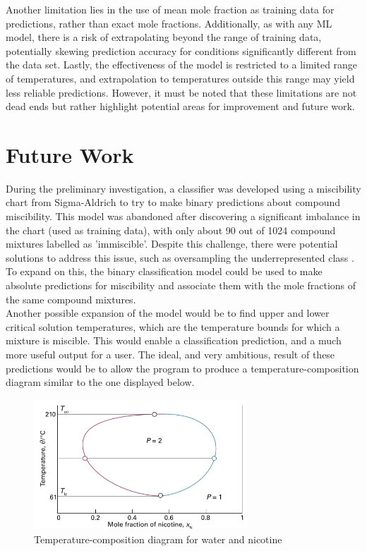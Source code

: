 \documentclass[11pt, titlepage]{article}
\begin{document}
Another limitation lies in the use of mean mole fraction as training data for predictions, rather than exact mole fractions. Additionally, as with any ML model, there is a risk of extrapolating beyond the range of training data, potentially skewing prediction accuracy for conditions significantly different from the data set. Lastly, the effectiveness of the model is restricted to a limited range of temperatures, and extrapolation to temperatures outside this range may yield less reliable predictions. However, it must be noted that these limitations are not dead ends but rather highlight potential areas for improvement and future work.\\

\section{Future Work}
\label{section:future work}
During the preliminary investigation, a classifier was developed using a miscibility chart from Sigma-Aldrich \cite{sigma} to try to make binary predictions about compound miscibility. This model was abandoned after discovering a significant imbalance in the chart (used as training data), with only about 90 out of 1024 compound mixtures labelled as 'immiscible'. Despite this challenge, there were potential solutions to address this issue, such as oversampling the underrepresented class \cite{oversampling}. To expand on this, the binary classification model could be used to make absolute predictions for miscibility and associate them with the mole fractions of the same compound mixtures.\\

Another possible expansion of the model would be to find upper and lower critical solution temperatures, which are the temperature bounds for which a mixture is miscible\cite{ucst}. This would enable a classification prediction, and a much more useful output for a user. The ideal, and very ambitious, result of these predictions would be to allow the program to produce a temperature-composition diagram similar to the one displayed below.

\begin{figure}[ht]
\centering
\includegraphics[width=8cm]{media/tempcomp.png}
\caption{Temperature-composition diagram for water and nicotine\cite{atkins}}
\end{figure}
\end{document}
